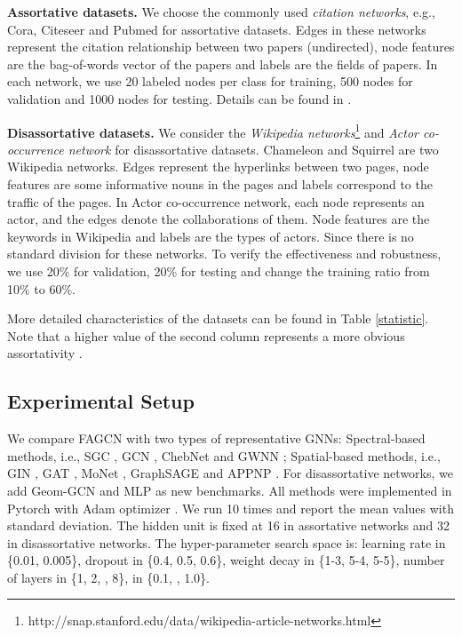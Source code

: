 \documentclass[letterpaper]{article} \usepackage{aaai21}  \usepackage{times}  \usepackage{helvet} \usepackage{courier}  \usepackage[hyphens]{url}  \usepackage{graphicx} \urlstyle{rm} \def\UrlFont{\rm}  \usepackage{natbib}  \usepackage{caption} \frenchspacing  \setlength{\pdfpagewidth}{8.5in}  \setlength{\pdfpageheight}{11in}
\begin{document}
\textbf{Assortative datasets.} We choose the commonly used \emph{citation networks}, e.g., Cora, Citeseer and Pubmed for assortative datasets. Edges in these networks represent the citation relationship between two papers (undirected), node features are the bag-of-words vector of the papers and labels are the fields of papers. In each network, we use 20 labeled nodes per class for training, 500 nodes for validation and 1000 nodes for testing. Details can be found in \cite{GCN}.

\noindent
\textbf{Disassortative datasets.} We consider the \emph{Wikipedia networks}\footnote{http://snap.stanford.edu/data/wikipedia-article-networks.html} and \emph{Actor co-occurrence network} \cite{actornet} for disassortative datasets. 
Chameleon and Squirrel are two Wikipedia networks. Edges represent the hyperlinks between two pages, node features are some informative nouns in the pages and labels correspond to the traffic of the pages.
In Actor co-occurrence network, each node represents an actor, and the edges denote the collaborations of them. Node features are the keywords in Wikipedia and labels are the types of actors. 
Since there is no standard division for these networks. To verify the effectiveness and robustness, we use 20\% for validation, 20\% for testing and change the training ratio from 10\% to 60\%. 

More detailed characteristics of the datasets can be found in Table \ref{statistic}. Note that a higher value of the second column represents a more obvious assortativity \cite{mixing}.

\subsection{Experimental Setup}
\label{setup}

We compare FAGCN with two types of representative GNNs: Spectral-based methods, i.e., SGC \cite{SGC},  GCN \cite{GCN}, ChebNet \cite{ChebNet} and GWNN \cite{GWNN}; Spatial-based methods, i.e., GIN \cite{GIN}, GAT \cite{GAT}, MoNet \cite{MoNet}, GraphSAGE \cite{GraphSAGE} and APPNP \cite{PPNP}. For disassortative networks, we add Geom-GCN \cite{GeomGCN} and MLP as new benchmarks.
All methods were implemented in Pytorch with Adam optimizer \cite{Adam}.
We run 10 times and report the mean values with standard deviation. The hidden unit is fixed at 16 in assortative networks and 32 in disassortative networks.
The hyper-parameter search space is: learning rate in \{0.01, 0.005\}, dropout in \{0.4, 0.5, 0.6\}, weight decay in \{1-3, 5-4, 5-5\}, number of layers in \{1, 2, , 8\},  in \{0.1, , 1.0\}.
\end{document}
